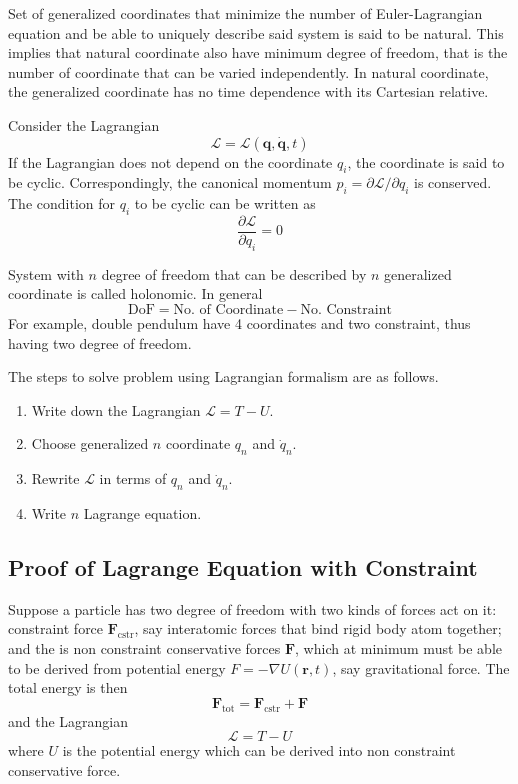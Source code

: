 \documentclass[../../../main.tex]{subfiles}
\begin{document}
Set of generalized coordinates that minimize the number of Euler-Lagrangian equation and be able to uniquely describe said system is said to be natural.
This implies that natural coordinate also have minimum degree of freedom, that is the number of coordinate that can be varied independently.
In natural coordinate, the generalized coordinate has no time dependence with its Cartesian relative.

Consider the Lagrangian 
\begin{equation*}
	\mathcal{L }=\mathcal{L }\left( \mathbf{q}, \dot{\mathbf{q }},t \right) 
\end{equation*}
If the Lagrangian does not depend on the coordinate $q_i$, the coordinate is said to be cyclic.
Correspondingly, the canonical momentum $p_i= \partial \mathcal{L }/\partial q_i$ is conserved.
The condition for $q_i$ to be cyclic can be written as 
\begin{equation*}
	\frac{\partial \mathcal{L }}{\partial q_i }=0
\end{equation*}

System with $n$ degree of freedom that can be described by $n$ generalized coordinate is called holonomic.
In general
\begin{equation*}
	\text{DoF}=\text{No. of Coordinate}-\text{No. Constraint}
\end{equation*}
For example, double pendulum have 4 coordinates and two constraint, thus having two degree of freedom.

The steps to solve problem using Lagrangian formalism are as follows.
\begin{enumerate}
	\item Write down the Lagrangian $\mathcal{L}=T-U$.
	\item Choose generalized $n$ coordinate $q_n$ and $\dot{q}_n$.
	\item Rewrite $\mathcal{L}$ in terms of $q_n$ and $\dot{q}_n$.
	\item Write $n$ Lagrange equation.
\end{enumerate}

\subsection{Proof of Lagrange Equation with Constraint}
Suppose a particle has two degree of freedom with two kinds of forces act on it:
constraint force $\mathbf{F}_\text{cstr}$, say interatomic forces that bind rigid body atom together;
and the is non constraint conservative forces $\mathbf{F}$, which at minimum must be able to be derived from potential energy $F=-\nabla U(\mathbf{r},t)$, say gravitational force.
The total energy is then
\begin{equation*}
	\mathbf{F}_\text{tot}=\mathbf{F}_\text{cstr}+\mathbf{F}
\end{equation*}
and the Lagrangian
\begin{equation*}
	\mathcal{L}=T-U
\end{equation*}
where $U$ is the potential energy which can be derived into non constraint conservative force.
\end{document}
